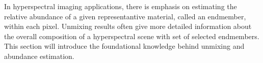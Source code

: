 In hyperspectral imaging applications, there is emphasis on estimating the relative abundance of a given representantive material, called an endmember, within each pixel.  Unmixing results often give more detailed information about the overall composition of a hyperspectral scene with set of selected endmembers. This section will introduce the foundational knowledge behind unmixing and abundance estimation. 

